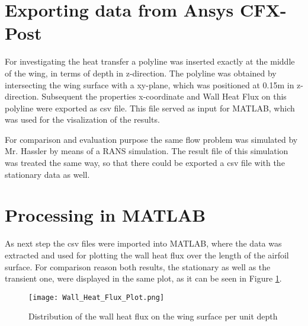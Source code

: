 \section{Exporting data from Ansys CFX-Post}
For investigating the heat transfer a polyline was inserted exactly at the middle of the wing, in terms of depth in z-direction. The polyline was obtained by intersecting the wing surface with a xy-plane, which was positioned at 0.15m in z-direction. 
Subsequent the properties x-coordinate and Wall Heat Flux on this polyline were exported as csv file. This file served as input for MATLAB\textsuperscript{\textregistered}, which was used for the visalization of the results.

For comparison and evaluation purpose the same flow problem was simulated by Mr. Hassler by means of a RANS simulation. The result file of this simulation was treated the same way, so that there could be exported a csv file with the stationary data as well.
\section{Processing in MATLAB\textsuperscript{\textregistered}}
As next step the csv files were imported into MATLAB\textsuperscript{\textregistered}, where the data was extracted and used for plotting the wall heat flux over the length of the airfoil surface. For comparison reason both results, the stationary as well as the transient one, were displayed in the same plot, as it can be seen in Figure \ref{fig:whf_plot}.

\begin{figure}[ht]
\centering
\texttt{[image: Wall\_Heat\_Flux\_Plot.png]}
\caption{Distribution of the wall heat flux on the wing surface per unit depth}
\label{fig:whf_plot}
\end{figure}


